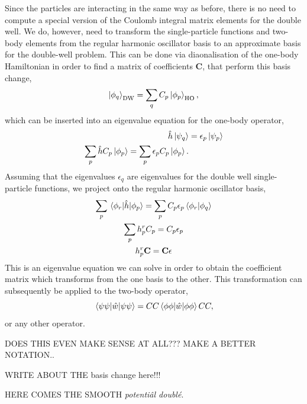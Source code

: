 Since the particles are interacting in the same way as before, there is no need 
to compute a special version of the Coulomb integral matrix elements for the 
double well. We do, however, need to transform the single-particle functions and 
two-body elements from the regular harmonic oscillator basis to an approximate basis 
for the double-well problem. This can be done via diaonalisation of the one-body 
Hamiltonian in order to find a matrix of coefficients $\mathbf{C}$, that perform 
this basis change,
\begin{equation}
    \ket{\phi_q}_\text{DW} = \sum_q C_p \ket{\phi_p}_\text{HO},
\end{equation}
which can be inserted into an eigenvalue equation for the one-body operator,
\begin{equation}
    \begin{aligned}
        \hat{h} \ket{\psi_q} &= \epsilon_p\ket{\psi_p} \\
        \sum_p \hat{h}C_p \ket{\phi_p} = \sum_p\epsilon_p C_p\ket{\phi_p}.
    \end{aligned}
\end{equation}
Assuming that the eigenvalues $\epsilon_q$ are eigenvalues for the double well 
single-particle functions, we project onto the regular harmonic oscillator 
basis,
\begin{equation}
    \begin{gathered}
     \sum_p\mel{\phi_r}{\hat{h}}{\phi_p} 
        = \sum_p C_p \epsilon_p \braket{\phi_r}{\phi_q} \\
    \sum_p h^r_p C_p = C_p\epsilon_p \\
    h^r_p \mathbf{C} = \mathbf{C} \mathbf{\epsilon}
    \end{gathered}
\end{equation}
This is an eigenvalue equation we can solve in order to obtain the coefficient 
matrix which transforms from the one basis to the other. This transformation
can subsequently be applied to the two-body operator,
\begin{equation}
    \mel{\psi\psi}{\hat{w}}{\psi\psi} = C C \mel{\phi\phi}{\hat{w}}{\phi\phi} C C,
\end{equation}
or any other operator.

DOES THIS EVEN MAKE SENSE AT ALL??? MAKE A BETTER NOTATION..

WRITE ABOUT THE basis change here!!!

HERE COMES THE SMOOTH \emph{potentiâl doublé}.



